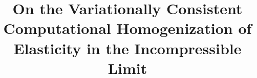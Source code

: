 \documentclass{bmcart}
\begin{document}
\begin{frontmatter}

\begin{fmbox}


\title{On the Variationally Consistent Computational Homogenization of Elasticity in the Incompressible Limit}


\author[
   addressref={aff1},                   %
   noteref={n1},                        %
   email={mikael.ohman@chalmers.se}   %
]{ }
\author[
   addressref={aff1},
   noteref={n1},                        %
   email={kenneth.runesson@chalmers.se}
]{ }
\author[
   addressref={aff1},
   noteref={n1},                        %
   email={fredrik.larsson@chalmers.se}
]{ }


\address[id=aff1]{%
  ,
  ,
  ,
}


\end{fmbox}
\end{frontmatter}
\end{document}
